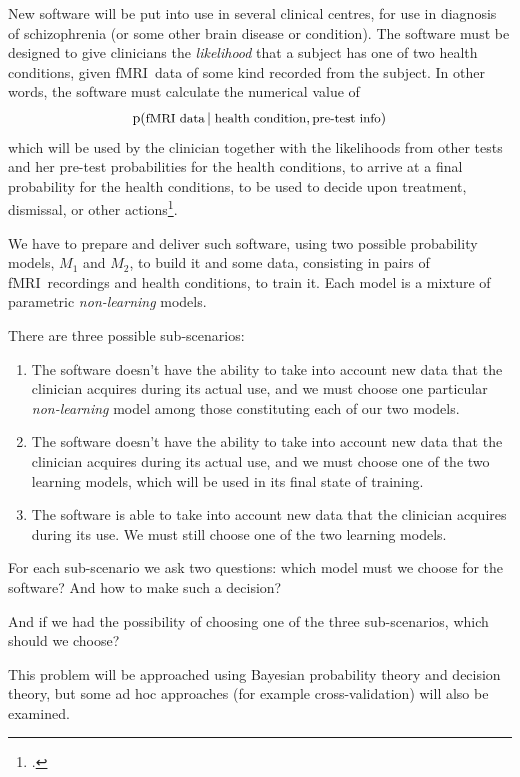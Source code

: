 \documentclass[\ifafour a4paper,12pt,\else a5paper,10pt,\fi%
onecolumn,oneside,article,%
british%
]{memoir}
\theoremstyle{remark}
\theoremstyle{innote}
\newcommand*{\citep}{\footcites}
\newcommand*{\pf}{\mathrm{p}}%
\renewcommand*{\|}[1][]{\nonscript\,#1\vert\nonscript\;\mathopen{}}
\newcommand*{\sect}{\S}%
\newcommand*{\ptext}[1]{\text{\small #1}}
\newcommand*{\fmri}{fMRI}
\newcommand*{\Ma}{M_1}
\newcommand*{\Mb}{M_2}
\begin{document}
New software will be put into use in several clinical centres, for use in
diagnosis of schizophrenia (or some other brain disease or condition). The
software must be designed to give clinicians the \emph{likelihood} that a
subject has one of two health conditions, given \fmri\ data of some kind
recorded from the subject. In other words, the software must calculate the
numerical value of
\begin{equation}
  \label{eq:software_likelihood}
  \pf(\ptext{\fmri\ data} \| \ptext{health condition}, \ptext{pre-test info})
\end{equation}
which will be used by the clinician together with the likelihoods from
other tests and her pre-test probabilities for the health conditions, to
arrive at a final probability for the health conditions, to be used to
decide upon treatment, dismissal, or other
actions\citep[\sect~1]{portamanaetal2018}.

We have to prepare and deliver such software, using two possible
probability models, $\Ma$ and $\Mb$, to build it and some data, consisting
in pairs of \fmri\ recordings and health conditions, to train it. Each
model is a mixture of parametric \emph{non-learning} models.

There are three possible sub-scenarios:
\begin{enumerate}[label=(S\arabic*)]
\item The software doesn't have the ability to take into account new data
  that the clinician acquires during its actual use, and we must choose one
  particular \emph{non-learning} model among those constituting each of our
  two models.
\item The software doesn't have the ability to take into account new data
  that the clinician acquires during its actual use, and we must choose one
  of the two learning models, which will be used in its final state of
  training.
\item The software is able to take into account new data that the clinician
  acquires during its use. We must still choose one of the two learning
  models.
\end{enumerate}

For each sub-scenario we ask two questions: which model must we choose for
the software? And how to make such a decision?

And if we had the possibility of choosing one of the three sub-scenarios,
which should we choose?

\medskip

This problem will be approached using Bayesian probability theory and
decision theory, but some ad hoc approaches (for example cross-validation)
will also be examined.
\end{document}
